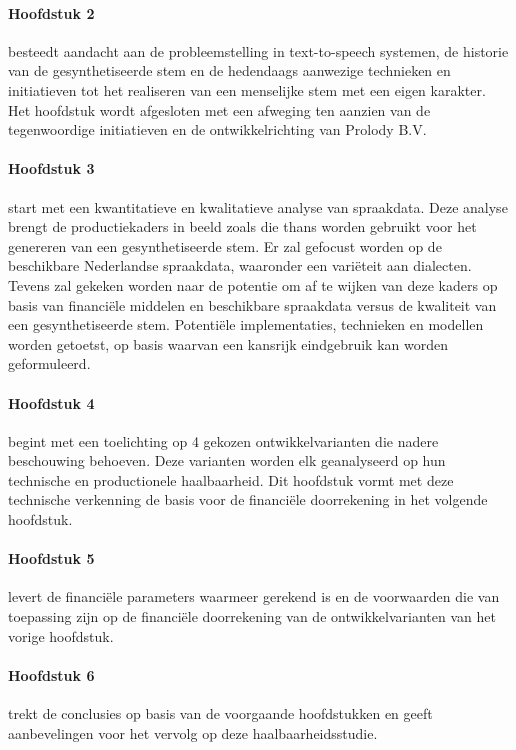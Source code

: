 \paragraph{Hoofdstuk 2} besteedt aandacht aan de probleemstelling in text-to-speech systemen, de historie van de gesynthetiseerde stem en de hedendaags aanwezige technieken en initiatieven tot het realiseren van een menselijke stem met een eigen karakter. Het hoofdstuk wordt afgesloten met een afweging ten aanzien van de tegenwoordige initiatieven en de ontwikkelrichting van Prolody B.V.

\paragraph{Hoofdstuk 3} start met een kwantitatieve en kwalitatieve analyse van spraakdata. Deze analyse brengt de productiekaders in beeld zoals die thans worden gebruikt voor het genereren van een gesynthetiseerde stem. Er zal gefocust worden op de beschikbare Nederlandse spraakdata, waaronder een variëteit aan dialecten. Tevens zal gekeken worden naar de potentie om af te wijken van deze kaders op basis van financiële middelen en beschikbare spraakdata versus de kwaliteit van een gesynthetiseerde stem. Potentiële implementaties, technieken en modellen worden getoetst, op basis waarvan een kansrijk eindgebruik kan worden geformuleerd.

\paragraph{Hoofdstuk 4} begint met een toelichting op 4 gekozen ontwikkelvarianten die nadere beschouwing behoeven. Deze varianten worden elk geanalyseerd op hun technische en productionele haalbaarheid. Dit hoofdstuk vormt met deze technische verkenning de basis voor de financiële doorrekening in het volgende hoofdstuk.

\paragraph{Hoofdstuk 5} levert de financiële parameters waarmeer gerekend is en de voorwaarden die van toepassing zijn op de financiële doorrekening van de ontwikkelvarianten van het vorige hoofdstuk.

\paragraph{Hoofdstuk 6} trekt de conclusies op basis van de voorgaande hoofdstukken en geeft aanbevelingen voor het vervolg op deze haalbaarheidsstudie.